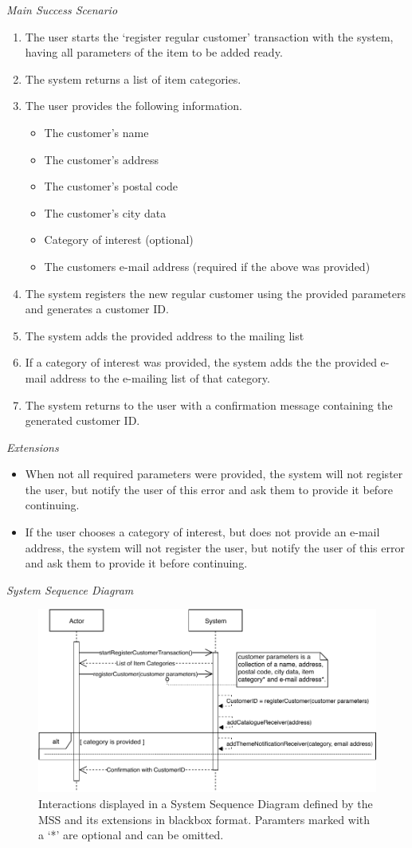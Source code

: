 \textsl{Main Success Scenario}
\begin{enumerate}[noitemsep]
	\item The user starts the `register regular customer' transaction with the system, having all parameters of the item to be added ready.
	\item The system returns a list of item categories.
	\item The user provides the following information.
	\begin{itemize}[noitemsep]
		\item The customer's name
		\item The customer's address
		\item The customer's postal code
		\item The customer's city data
		\item Category of interest (optional)
		\item The customers e-mail address (required if the above was provided)
	\end{itemize}
	\item The system registers the new regular customer using the provided parameters and generates a customer ID.
	\item The system adds the provided address to the mailing list
	\item If a category of interest was provided, the system adds the the provided e-mail address to the e-mailing list of that category.
	\item The system returns to the user with a confirmation message containing the generated customer ID. 
\end{enumerate}
\textsl{Extensions}
\begin{itemize}[noitemsep]
	\item When not all required parameters were provided, the system will not register the user, but notify the user of this error and ask them to provide it before continuing.
	\item If the user chooses a category of interest, but does not provide an e-mail address, the system will not register the user, but notify the user of this error and ask them to provide it before continuing.
\end{itemize}
\textsl{System Sequence Diagram}
\begin{figure}[H]
	\centering
	\includegraphics[scale=1]{uml/SD-bb-regcust.pdf}
	\caption*{Interactions displayed in a System Sequence Diagram defined by the MSS and its extensions in blackbox format. Paramters marked with a `*' are optional and can be omitted.}
\end{figure}